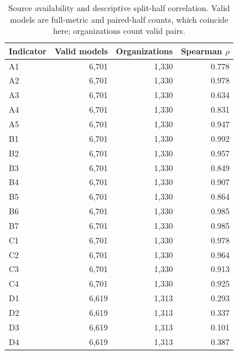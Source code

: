 \begin{table}[htbp]\centering\small
\caption{Source availability and descriptive split-half correlation. Valid models are full-metric and paired-half counts, which coincide here; organizations count valid pairs.}\label{tab:stability}
\begin{tabular}{lrrr}\toprule Indicator & Valid models & Organizations & Spearman $\rho$\\\midrule
A1 & 6,701 & 1,330 & 0.778\\
A2 & 6,701 & 1,330 & 0.978\\
A3 & 6,701 & 1,330 & 0.634\\
A4 & 6,701 & 1,330 & 0.831\\
A5 & 6,701 & 1,330 & 0.947\\
B1 & 6,701 & 1,330 & 0.992\\
B2 & 6,701 & 1,330 & 0.957\\
B3 & 6,701 & 1,330 & 0.849\\
B4 & 6,701 & 1,330 & 0.907\\
B5 & 6,701 & 1,330 & 0.864\\
B6 & 6,701 & 1,330 & 0.985\\
B7 & 6,701 & 1,330 & 0.985\\
C1 & 6,701 & 1,330 & 0.978\\
C2 & 6,701 & 1,330 & 0.964\\
C3 & 6,701 & 1,330 & 0.913\\
C4 & 6,701 & 1,330 & 0.925\\
D1 & 6,619 & 1,313 & 0.293\\
D2 & 6,619 & 1,313 & 0.337\\
D3 & 6,619 & 1,313 & 0.101\\
D4 & 6,619 & 1,313 & 0.387\\
\bottomrule\end{tabular}\end{table}
